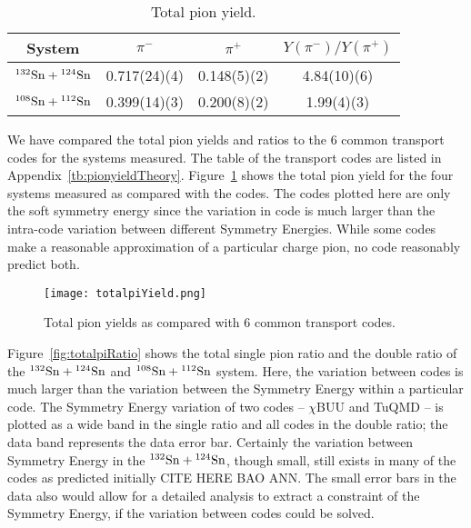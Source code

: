 \begin{table*}\centering
{}
\begin{tabular}{@{}cccc@{}}\toprule
System & $\pi^-$ & $\pi^+$ & $Y(\pi^-)/Y(\pi^+)$  \\
\midrule
${}^{132}\mathrm{Sn} + {}^{124}\mathrm{Sn}$ & 0.717(24)(4) & 0.148(5)(2) & 4.84(10)(6)  \\
${}^{108}\mathrm{Sn} + {}^{112}\mathrm{Sn}$ & 0.399(14)(3) & 0.200(8)(2) & 1.99(4)(3)  \\
\bottomrule
\end{tabular}
\caption{Total pion yield.}
\label{tb:pionyield}
\end{table*}


We have compared the total pion yields and ratios to the 6 common transport codes for the systems measured. The table of the transport codes are listed in Appendix~\ref{tb:pionyieldTheory}. Figure~\ref{fig:totalpiYield} shows the total pion yield for the four systems measured as compared with the codes. The codes plotted here are only the soft symmetry energy since the variation in code is much larger than the intra-code variation between different Symmetry Energies. While some codes make a reasonable approximation of a particular charge pion, no code reasonably predict both. 

\begin{figure}[!htb]
\centering
\texttt{[image: totalpiYield.png]}
\caption{Total pion yields as compared with 6 common transport codes.}
\label{fig:totalpiYield}
\end{figure}

Figure~\ref{fig:totalpiRatio} shows the total single pion ratio and the double ratio of the ${}^{132}\mathrm{Sn} + {}^{124}\mathrm{Sn}$ and ${}^{108}\mathrm{Sn} + {}^{112}\mathrm{Sn}$ system. Here, the variation between codes is much larger than the variation between the Symmetry Energy within a particular code. The Symmetry Energy variation of two codes -- $\chi$BUU and TuQMD -- is plotted as a wide band in the single ratio and all codes in the double ratio; the data band represents the data error bar. Certainly the variation between Symmetry Energy in the ${}^{132}\mathrm{Sn} + {}^{124}\mathrm{Sn}$, though small, still exists in many of the codes as predicted initially CITE HERE BAO ANN. The small error bars in the data also would allow for a detailed analysis to extract a constraint of the Symmetry Energy, if the variation between codes could be solved. 



